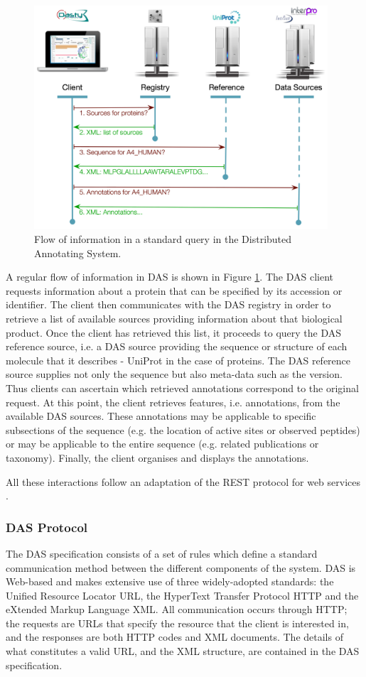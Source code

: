 \begin{figure}  
\centering
\includegraphics[width=4.3in]{figures/DAS.png}
\caption[DAS Flow of Information.]{Flow of information in a standard query in the Distributed Annotating System.
\label{fig:das}}
\end{figure}

A regular flow of information in DAS is shown in Figure \ref{fig:das}. The DAS client requests information about a protein that can be specified by its accession or identifier. The client then communicates with the DAS registry in order to retrieve a list of available sources providing information about that biological product. Once the client has retrieved this list, it proceeds to query the DAS reference source, i.e. a DAS source providing the sequence or structure of each molecule that it describes - UniProt in the case of proteins. The DAS reference source supplies not only the sequence but also meta-data such as the version. Thus clients can ascertain which retrieved annotations correspond to the original request. At this point, the client retrieves features, i.e. annotations, from the available DAS sources. These annotations may be applicable to specific subsections of the sequence (e.g. the location of active sites or observed peptides) or may be applicable to the entire sequence (e.g. related publications or taxonomy). Finally, the client organises and displays the annotations. 

All these interactions follow an adaptation of the REST protocol for web services\cite{PRL2007} .

\subsubsection{DAS Protocol}
\label{ssec:DASprotocol}
The DAS specification consists of a set of rules which define a standard communication method between the different components of the system. DAS is Web-based and makes extensive use of three widely-adopted standards: the Unified Resource Locator URL, the HyperText Transfer Protocol HTTP and the eXtended Markup Language XML. All communication occurs through HTTP; the requests are URLs that specify the resource that the client is interested in, and the responses are both HTTP codes and XML documents. The details of what constitutes a valid URL, and the XML structure, are contained in the DAS specification.

